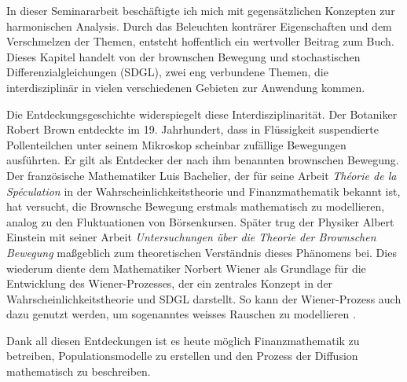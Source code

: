 %
%
%
%

In dieser Seminararbeit beschäftigte ich mich mit gegensätzlichen Konzepten zur harmonischen Analysis. Durch das Beleuchten konträrer Eigenschaften und dem Verschmelzen der Themen, entsteht hoffentlich ein wertvoller Beitrag zum Buch. Dieses Kapitel handelt von der brownschen Bewegung und stochastischen Differenzialgleichungen (SDGL), zwei eng verbundene Themen, die interdisziplinär in vielen verschiedenen Gebieten zur Anwendung kommen.

Die Entdeckungsgeschichte widerspiegelt diese Interdisziplinarität. Der Botaniker Robert Brown entdeckte im 19. Jahrhundert, dass in Flüssigkeit suspendierte Pollenteilchen unter seinem Mikroskop scheinbar zufällige Bewegungen ausführten. Er gilt als Entdecker der nach ihm benannten brownschen Bewegung. Der französische Mathematiker Luis Bachelier, der für seine Arbeit \textit{Théorie de la Spéculation} \cite{bachelier1900théorie} in der Wahrscheinlichkeitstheorie und Finanzmathematik bekannt ist, hat versucht, die Brownsche Bewegung erstmals mathematisch zu modellieren, analog zu den Fluktuationen von Börsenkursen. Später trug der Physiker Albert Einstein mit seiner Arbeit \textit{Untersuchungen über die Theorie der Brownschen Bewegung} \cite{einstein1922untersuchungen} maßgeblich zum theoretischen Verständnis dieses Phänomens bei. Dies wiederum diente dem Mathematiker Norbert Wiener als Grundlage für die Entwicklung des Wiener-Prozesses, der ein zentrales Konzept in der Wahrscheinlichkeitstheorie und SDGL darstellt. So kann der Wiener-Prozess auch dazu genutzt werden, um sogenanntes weisses Rauschen zu modellieren .

Dank all diesen Entdeckungen ist es heute möglich Finanzmathematik zu betreiben, Populationsmodelle zu erstellen und den Prozess der Diffusion mathematisch zu beschreiben. %